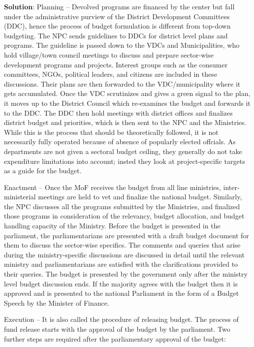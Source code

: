\documentclass[
]{book}
\newenvironment{solution}{ {\bfseries Solution}:}{}
\begin{document}
\begin{questions}
\begin{solution}
Planning -- Devolved programs are financed by the center but fall under the administrative purview of the District Development Committees (DDC), hence the process of budget formulation is different from top-down budgeting. The NPC sends guidelines to DDCs for district level plans and programs. The guideline is passed down to the VDCs and Municipalities, who hold village/town council meetings to discuss and prepare sector-wise development programs and projects. Interest groups such as the consumer committees, NGOs, political leaders, and citizens are included in these discussions. Their plans are then forwarded to the VDC/municipality where it gets accumulated. Once the VDC scrutinizes and gives a green signal to the plan, it moves up to the District Council which re-examines the budget and forwards it to the DDC. The DDC then hold meetings with district offices and finalizes district budget and priorities, which is then sent to the NPC and the Ministries. While this is the process that should be theoretically followed, it is not necessarily fully operated because of absence of popularly elected offcials. As departments are not given a sectoral budget ceiling, they generally do not take expenditure limitations into account; insted they look at project-specific targets as a guide for the budget.

Enactment -- Once the MoF receives the budget from all line ministries, inter-ministerial meetings are held to vet and finalize the national budget. Similarly, the NPC discusses all the programs submitted by the Ministries, and finalized those programs in consideration of the relevancy, budget allocation, and budget handling capacity of the Ministry. Before the budget is presented in the parliament, the parliamentarians are presented with a draft budget document for them to discuss the sector-wise specifics. The comments and queries that arise during the ministry-specific discussions are discussed in detail until the relevant ministry and parliamentarians are satisfied with the clarifications provided to their queries. The budget is presented by the government only after the ministry level budget discussion ends. If the majority agrees with the budget then it is approved and is presented to the national Parliament in the form of a Budget Speech by the Minister of Finance.

Execution -- It is also called the procedure of releasing budget. The process of fund release starts with the approval of the budget by the parliament. Two further steps are required after the parliamentary approval of the budget:


\end{solution}
\end{questions}
\end{document}
